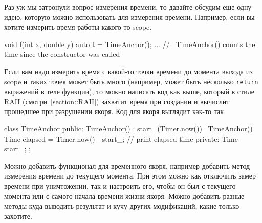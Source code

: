 Раз уж мы затронули вопрос измерения времени, то давайте обсудим еще одну идею, которую можно использовать для измерения времени.
Например, если вы хотите измерить время работы какого-то scope.
\begin{cppcode}
void f(int x, double y) {
  auto t = TimeAnchor();
  ...
} // ~TimeAnchor() counts the time since the constructor was called
\end{cppcode}
Если вам надо измерить время с какой-то точки времени до момента выхода из scope и таких точек может быть много (например, может быть несколько \verb"return" выражений в теле функции), то можно написать код как выше, который в стиле RAII (смотри~\ref{section::RAII}) захватит время при создании и вычислит прошедшее при разрушении якоря.
Код для якоря выглядит как-то так
\begin{cppcode}
class TimeAnchor {
public:
  TimeAnchor() : start_(Timer.now()) {}
  ~TimeAnchor() {
    Time elapsed = Timer.now() - start_;
    // print elapsed time
  }
private:
  Time start_;
};
\end{cppcode}
Можно добавить функционал для временного якоря, например добавить метод измерения времени до текущего момента.
При этом можно как отключить замер времени при уничтожении, так и настроить его, чтобы он был с текущего момента или с самого начала времени жизни якоря.
Можно добавить разные методы куда выводить результат и кучу других модификаций, какие только захотите.
